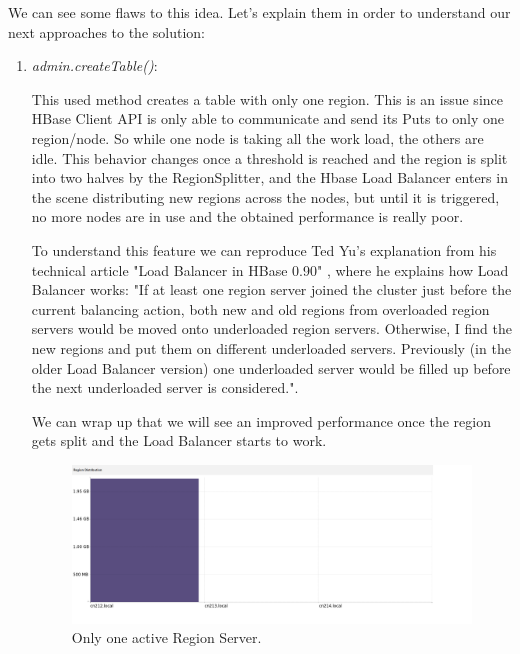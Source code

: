\bigskip


\par

We can see some flaws to this idea. Let's explain them in order to understand our next approaches to the solution:

\begin{enumerate}
\item \textit{admin.createTable()}:
\par
This used method creates a table with only one region. This is an issue since HBase Client API is only able to communicate and send its Puts to only one region/node. So while one node is taking all the work load, the others are idle. This behavior changes once a threshold is reached and the region is split into two halves by the RegionSplitter, and the Hbase Load Balancer enters in the scene distributing new regions across the nodes, but until it is triggered, no more nodes are in use and the obtained performance is really poor.
\par

To understand this feature we can reproduce Ted Yu's explanation from his technical article "Load Balancer in HBase 0.90" \cite{LoadBalancer}, where he explains how Load Balancer works: "If at least one region server joined the cluster just before the current balancing action, both new and old regions from overloaded region servers would be moved onto underloaded region servers. Otherwise, I find the new regions and put them on different underloaded servers. Previously (in the older Load Balancer version) one underloaded server would be filled up before the next underloaded server is considered.".
\par
We can wrap up that we will see an improved performance once the region gets split and the Load Balancer starts to work.



\bigskip
\begin{figure}[htb]
\centering
\includegraphics[width=1.2\textwidth,height=0.41\textheight]{./images/1regionserveractive1.png}
\caption{Only one active Region Server.} \label{fig:1regionserveractive}
\end{figure}



\end{enumerate}
